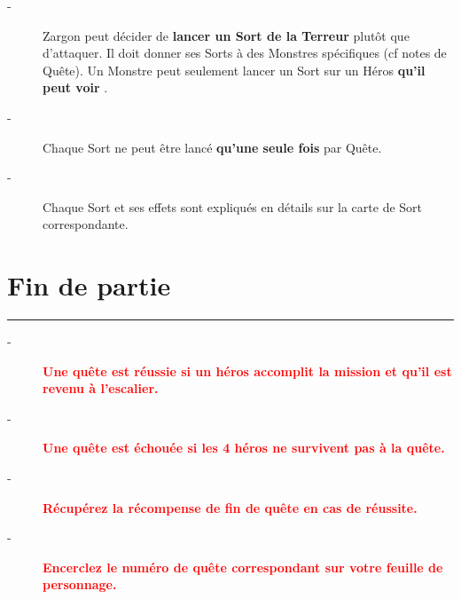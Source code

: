 \documentclass{scrartcl}%
\begin{document}
\begin{description}%
\item[{-} ]%
%
 Zargon peut décider de %
\textcolor{mygreen}{%
\textbf{lancer un Sort de la Terreur}%
}%
\textit{ }%
 plutôt que d'attaquer. Il doit donner ses Sorts à des Monstres spécifiques (cf notes de Quête). Un Monstre peut seulement lancer un Sort sur un Héros %
\textcolor{mygreen}{%
\textbf{qu'il peut voir}%
}%
.
%
\item[{-} ]%
%
 Chaque Sort ne peut être lancé %
\textcolor{mygreen}{%
\textbf{qu'une seule fois}%
}%
\textit{ }%
 par Quête.
%
\item[{-} ]%
%
 Chaque Sort et ses effets sont expliqués en détails sur la carte de Sort correspondante.
%
\end{description}

%
\sectionfont{\color{red}}%
\subsectionfont{\color{red}}%
\subsubsectionfont{\color{red}}%
\section{ Fin de partie
}%
\label{sec:Findepartie}%
\textcolor{red}{\rule{18cm}{0.07cm}}\break%
\begin{description}%
\item[{-} ]%
%
\textcolor{red}{%
\textbf{Une quête est réussie si un héros accomplit la mission et qu'il est revenu à l'escalier.}%
}%

%
\item[{-} ]%
%
\textcolor{red}{%
\textbf{Une quête est échouée si les 4 héros ne survivent pas à la quête.}%
}%

%
\item[{-} ]%
%
\textcolor{red}{%
\textbf{Récupérez la récompense de fin de quête en cas de réussite.}%
}%

%
\item[{-} ]%
%
\textcolor{red}{%
\textbf{Encerclez le numéro de quête correspondant sur votre feuille de personnage.}%
}%
\end{description}

%
\end{document}
